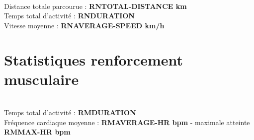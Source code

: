 \documentclass[a4paper,french,11pt]{report}
\begin{document}
\\
\textbullet Distance totale parcourue : \textbf{RNTOTAL-DISTANCE km}\\
\textbullet Temps total d'activité : \textbf{RNDURATION} \\
\textbullet Vitesse moyenne : \textbf{RNAVERAGE-SPEED km/h}


\section*{Statistiques renforcement musculaire}
\thispagestyle{empty}


\\
\textbullet Temps total d'activité : \textbf{RMDURATION} \\
\textbullet Fréquence cardiaque moyenne : \textbf{RMAVERAGE-HR bpm} - maximale atteinte \textbf{RMMAX-HR bpm}\\

\end{document}
